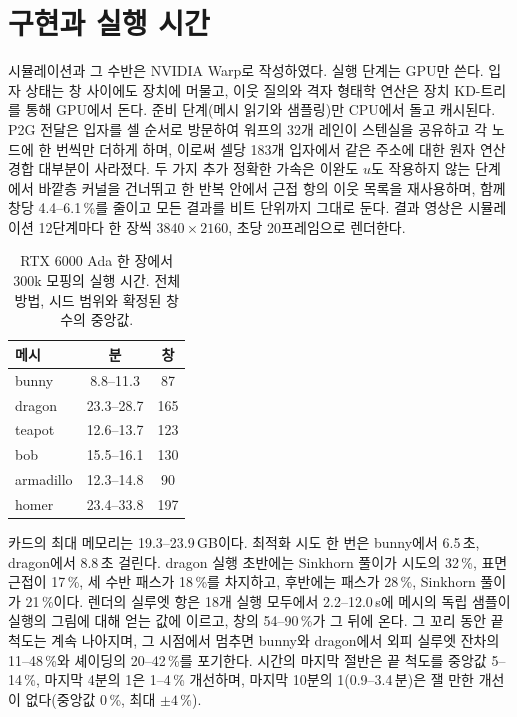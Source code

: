 \section{구현과 실행 시간}
\label{ch4:sec_implementation_ko}
시뮬레이션과 그 수반은 NVIDIA Warp로 작성하였다. 실행 단계는 GPU만 쓴다. 입자 상태는 창 사이에도 장치에 머물고, 이웃 질의와
격자 형태학 연산은 장치 KD-트리를 통해 GPU에서 돈다. 준비 단계(메시 읽기와 샘플링)만 CPU에서 돌고 캐시된다. P2G 전달은
입자를 셀 순서로 방문하여 워프의 32개 레인이 스텐실을 공유하고 각 노드에 한 번씩만 더하게 하며, 이로써 셀당 183개 입자에서
같은 주소에 대한 원자 연산 경합 대부분이 사라졌다. 두 가지 추가 정확한 가속은 이완도 $u$도 작용하지 않는 단계에서 바깥층
커널을 건너뛰고 한 반복 안에서 근접 항의 이웃 목록을 재사용하며, 함께 창당 4.4--6.1\,\%를 줄이고 모든 결과를 비트 단위까지
그대로 둔다. 결과 영상은 시뮬레이션 12단계마다 한 장씩 $3840\times2160$, 초당 20프레임으로 렌더한다.

\begin{table}[t]
\centering
\footnotesize
\caption{RTX 6000 Ada 한 장에서 300k 모핑의 실행 시간. \textmd{전체 방법, 시드 범위와 확정된 창 수의 중앙값.}}
\label{ch4:tab_runtime_ko}
\begin{tabular}{lcc}
\toprule
메시 & 분 & 창 \\
\midrule
bunny & 8.8--11.3 & 87 \\
dragon & 23.3--28.7 & 165 \\
teapot & 12.6--13.7 & 123 \\
bob & 15.5--16.1 & 130 \\
armadillo & 12.3--14.8 & 90 \\
homer & 23.4--33.8 & 197 \\
\bottomrule
\end{tabular}
\end{table}

카드의 최대 메모리는 19.3--23.9\,GB이다. 최적화 시도 한 번은 bunny에서 6.5\,초, dragon에서 8.8\,초 걸린다. dragon 실행 초반에는
Sinkhorn 풀이가 시도의 32\,\%, 표면 근접이 17\,\%, 세 수반 패스가 18\,\%를 차지하고, 후반에는 패스가 28\,\%, Sinkhorn 풀이가
21\,\%이다. 렌더의 실루엣 항은 18개 실행 모두에서 2.2--12.0\,s에 메시의 독립 샘플이 실행의 그림에 대해 얻는 값에 이르고, 창의
54--90\,\%가 그 뒤에 온다. 그 꼬리 동안 끝 척도는 계속 나아지며, 그 시점에서 멈추면 bunny와 dragon에서 외피 실루엣 잔차의
11--48\,\%와 셰이딩의 20--42\,\%를 포기한다. 시간의 마지막 절반은 끝 척도를 중앙값 5--14\,\%, 마지막 4분의 1은 1--4\,\% 개선하며,
마지막 10분의 1(0.9--3.4\,분)은 잴 만한 개선이 없다(중앙값 0\,\%, 최대 $\pm4$\,\%).

